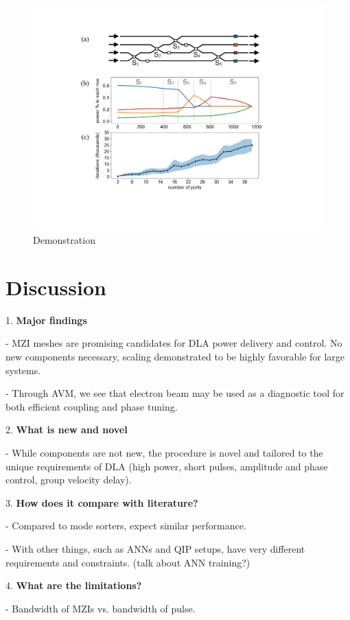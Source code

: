 \documentclass[%
 reprint,
 amsmath,amssymb,
 aps,
prstab,
floatfix,
]{revtex4-1}
\begin{document}
\begin{figure}
\includegraphics[width=1\columnwidth]{demo}
\caption{\label{fig:demo} Demonstration}
\end{figure}

\section{\label{sec:discussion}Discussion}
1. \textbf{Major findings}

- MZI meshes are promising candidates for DLA power delivery and control.  No new components necessary, scaling demonstrated to be highly favorable for large systems.

- Through AVM, we see that electron beam may be used as a diagnostic tool for both efficient coupling and phase tuning.

2. \textbf{What is new and novel}

- While components are not new, the procedure is novel and tailored to the unique requirements of DLA (high power, short pulses, amplitude and phase control, group velocity delay).

3. \textbf{How does it compare with literature?}

- Compared to mode sorters, expect similar performance.  

- With other things, such as ANNs and QIP setups, have very different requirements and constraints.  (talk about ANN training?)

4. \textbf{What are the limitations?}

- Bandwidth of MZIs vs. bandwidth of pulse.
 
\end{document}
